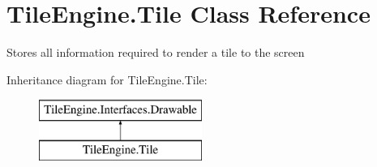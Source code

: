 \hypertarget{class_tile_engine_1_1_tile}{\section{Tile\-Engine.\-Tile Class Reference}
\label{d6/d07/class_tile_engine_1_1_tile}
}


Stores all information required to render a tile to the screen  


Inheritance diagram for Tile\-Engine.\-Tile\-:\begin{figure}[H]
\begin{center}
\leavevmode
\includegraphics[height=2.000000cm]{d6/d07/class_tile_engine_1_1_tile}
\end{center}
\end{figure}

